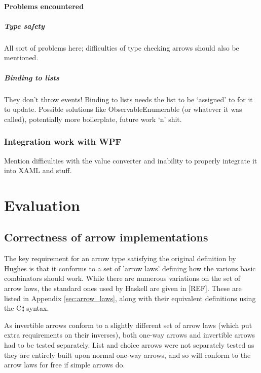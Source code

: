 \documentclass[12pt,twoside,notitlepage]{report}
\begin{document}
\subsubsection{Problems encountered}

\paragraph{Type safety}

All sort of problems here; difficulties of type checking arrows should also be mentioned.

\paragraph{Binding to lists}

They don't throw events! Binding to lists needs the list to be ‘assigned’ to for it to update. Possible solutions like ObservableEnumerable (or whatever it was called), potentially more boilerplate, future work ‘n’ shit.

\subsection{Integration work with WPF}

Mention difficulties with the value converter and inability to properly integrate it into XAML and stuff.

\cleardoublepage



\chapter{Evaluation}

\section{Correctness of arrow implementations}

The key requirement for an arrow type satisfying the original definition by Hughes is that it conforms to a set of 'arrow laws' defining how the various basic combinators should work. While there are numerous variations on the set of arrow laws, the standard ones used by Haskell are given in [REF]. These are listed in Appendix \ref{sec:arrow_laws}, along with their equivalent definitions using the C$\sharp$ syntax.

As invertible arrows conform to a slightly different set of arrow laws (which put extra requirements on their inverses), both one-way arrows and invertible arrows had to be tested separately. List and choice arrows were not separately tested as they are entirely built upon normal one-way arrows, and so will conform to the arrow laws for free if simple arrows do.
\end{document}
